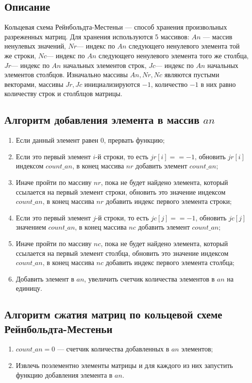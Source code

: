 \documentclass[12pt, a4paper]{article}
\begin{document}
\subsection{Описание}
Кольцевая схема Рейнбольдта-Местеньи --- способ 
хранения произвольных разреженных матриц. Для 
хранения используются 5 массивов: $An$ --- массив 
ненулевых значений, $Nr$--- индекс по $An$ 
следующего ненулевого элемента той же строки, $Nc$---
индекс по $An$ следующего ненулевого элемента того же
столбца, $Jr$--- индекс по $An$ начальных элементов 
строк, $Jc$--- индекс по $An$ начальных элементов 
столбцов. Изначально массивы $An, Nr, Nc$ являются
пустыми векторами, массивы $Jr, Jc$ инициализируются 
$-1$, количество $-1$ в них равно количеству строк и 
столблцов матрицы.
\subsection{Алгоритм добавления элемента в массив $an$}
\begin{enumerate}
	\item Если данный элемент равен 0, прервать функцию;
	\item Если это первый элемент $i$-й строки, то есть 
	$jr[i]==-1$, обновить $jr[i]$ индексом $count\_an$, 
	в конец массива $nr$ добавить элемент $count\_an$;
	\item Иначе пройти по массиву $nr$, пока не будет 
	найдено элемента, который ссылается на первый 
	элемент строки, обновить это значение индексом 
	$count\_an$, в конец массива $nr$ добавить 
	индекс первого элемента строки;
	\item Если это первый элемент $j$-й строки, то есть 
	$jc[j]==-1$, обновить $jc[j]$ значением $count\_an$, 
	в конец массива $nc$ добавить элемент $count\_an$;
	\item Иначе пройти по массиву $nc$, пока не будет 
	найдено элемента, который ссылается на первый 
	элемент столбца, обновить это значение индексом 
	$count\_an$, в конец массива $nc$ добавить 
	индекс первого элемента столбца;
	\item Добавить элемент в $an$, увеличить 
	счетчик количества элементов в $an$ на единицу.
\end{enumerate}
\subsection{Алгоритм сжатия матриц по кольцевой схеме 
Рейнбольдта-Местеньи}
\begin{enumerate}
	\item $count\_an = 0$ --- счетчик количества 
	добавленных в $an$ элементов;
	\item Извлечь поэлементно элементы матрицы и для 
	каждого из них запустить функцию добавления элемента
	в $an$.
\end{enumerate}
\end{document}
